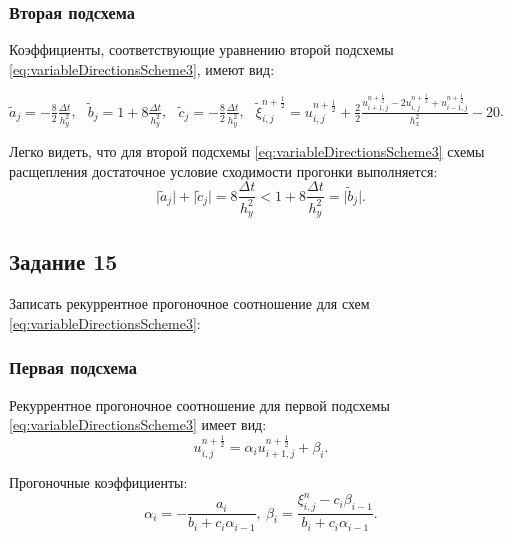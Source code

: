 \documentclass[12pt, a4paper]{report}
\begin{document}
	\subsubsection*{Вторая подсхема}
	\large
	Коэффициенты, соответствующие уравнению второй подсхемы \eqref{eq:variableDirectionsScheme3}, имеют вид:
	\small
	\begin{center}
		$\tilde{a}_{j}=-\frac{8}{2}\frac{\Delta t}{h_{y}^{2}}$, $\>$ $\tilde{b}_{j}=1 + 8\frac{\Delta t}{h_{y}^{2}}$, $\>$ $\tilde{c}_{j}=-\frac{8}{2}\frac{\Delta t}{h_{y}^{2}}$, $\>$ $\tilde{\xi}_{i, j}^{n+\frac{1}{2}}=u_{i, j}^{n+\frac{1}{2}} + \frac{2}{2}\frac{u_{i+1, j}^{n+\frac{1}{2}} - 2u_{i, j}^{n+\frac{1}{2}} + u_{i-1, j}^{n+\frac{1}{2}}}{h_{x}^{2}} - 20$.
	\end{center}
	\par
	\large
	Легко видеть, что для второй подсхемы \eqref{eq:variableDirectionsScheme3} схемы расщепления достаточное условие сходимости прогонки выполняется:
	\begin{equation*}
		\lvert \tilde{a}_{j} \rvert + \lvert \tilde{c}_{j} \rvert = 8\frac{\Delta t}{h_{y}^{2}} < 1 + 8\frac{\Delta t}{h_{y}^{2}} = \lvert \tilde{b}_{j} \rvert.
	\end{equation*}
	
	\subsection*{Задание 15}
	\large
	Записать рекуррентное прогоночное соотношение для схем \eqref{eq:variableDirectionsScheme3}:
	\subsubsection*{Первая подсхема}
	\large
	Рекуррентное прогоночное соотношение для первой подсхемы \eqref{eq:variableDirectionsScheme3} имеет вид:
	\begin{equation*}
		u_{i, j}^{n+\frac{1}{2}} = \alpha_{i}u_{i+1, j}^{n+\frac{1}{2}} + \beta_{i}.
	\end{equation*}
	\par
	Прогоночные коэффициенты:
	\begin{equation*}
		\alpha_{i} = -\frac{a_{i}}{b_{i} + c_{i}\alpha_{i-1}}, \> \beta_{i} = \frac{\xi_{i, j}^{n} - c_{i}\beta_{i-1}}{b_{i} + c_{i}\alpha_{i-1}}.
	\end{equation*}
\end{document}
